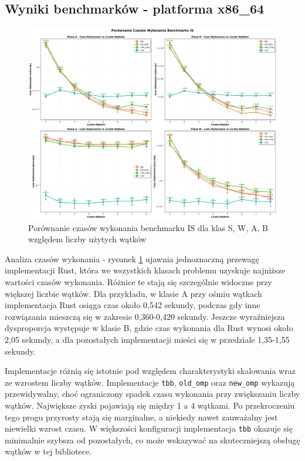 \subsection{Wyniki benchmarków - platforma x86\_64}
\begin{figure}[H]
    \centering
    \includegraphics[width=\textwidth]{analiza/images/parallel/is/x86/is_porownanie_czasow_wykonania.png}
    \caption{Porównanie czasów wykonania benchmarku IS dla klas S, W, A, B względem liczby użytych wątków}
    \label{is_porownanie_czasow_wykonania_x86}
\end{figure}
Analiza czasów wykonania - rysunek \ref{is_porownanie_czasow_wykonania_x86} ujawnia jednoznaczną przewagę implementacji Rust, która we wszystkich klasach problemu uzyskuje najniższe wartości czasów wykonania. Różnice te stają się szczególnie widoczne przy większej liczbie wątków. Dla przykładu, w klasie A przy ośmiu wątkach implementacja Rust osiąga czas około 0,542 sekundy, podczas gdy inne rozwiązania mieszczą się w zakresie 0,360-0,420 sekundy. Jeszcze wyraźniejsza dysproporcja występuje w klasie B, gdzie czas wykonania dla Rust wynosi około 2,05 sekundy, a dla pozostałych implementacji mieści się w przedziale 1,35-1,55 sekundy.

Implementacje różnią się istotnie pod względem charakterystyki skalowania wraz ze wzrostem liczby wątków. Implementacje \texttt{tbb}, \texttt{old\_omp} oraz \texttt{new\_omp} wykazują przewidywalny, choć ograniczony spadek czasu wykonania przy zwiększaniu liczby wątków. Największe zyski pojawiają się między 1 a 4 wątkami. Po przekroczeniu tego progu przyrosty stają się marginalne, a niekiedy nawet zauważalny jest niewielki wzrost czasu. W większości konfiguracji implementacja \texttt{tbb} okazuje się minimalnie szybsza od pozostałych, co może wskazywać na skuteczniejszą obsługę wątków w tej bibliotece.

